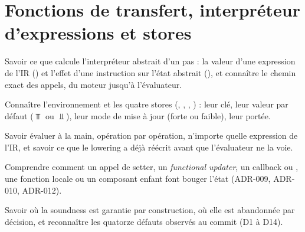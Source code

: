 \chapter{Fonctions de transfert, interpréteur d'expressions et stores}
\label{chap:transfert-stores}

\begin{objectifs}
  \item Savoir ce que calcule l'interpréteur abstrait d'un pas : la valeur d'une expression de l'IR () et l'effet d'une instruction sur l'état abstrait (), et connaître le chemin exact des appels, du moteur jusqu'à l'évaluateur.
  \item Connaître l'environnement  et les quatre stores (, , , ) : leur clé, leur valeur par défaut ($\Top$ ou $\Bot$), leur mode de mise à jour (forte ou faible), leur portée.
  \item Savoir évaluer à la main, opération par opération, n'importe quelle expression de l'IR, et savoir ce que le lowering a déjà réécrit avant que l'évaluateur ne la voie.
  \item Comprendre comment un appel de setter, un \emph{functional updater}, un callback  ou , une fonction locale ou un composant enfant font bouger l'état (ADR-009, ADR-010, ADR-012).
  \item Savoir où la soundness est garantie par construction, où elle est abandonnée par décision, et reconnaître les quatorze défauts observés au commit \snapshotCommit{} (D1 à D14).
\end{objectifs}

